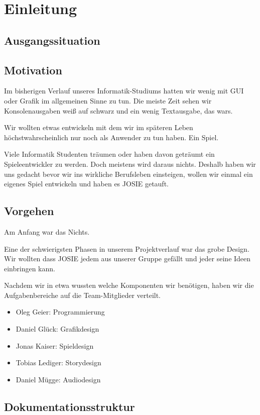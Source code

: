 \chapter{Einleitung}\label{ch:intro}

\section{Ausgangssituation}

\section{Motivation}

Im bisherigen Verlauf unseres Informatik-Studiums hatten wir wenig mit GUI oder Grafik im allgemeinen Sinne zu tun. Die meiste Zeit sehen wir Konsolenausgaben weiß auf schwarz und ein wenig Textausgabe, das wars. 

Wir wollten etwas entwickeln mit dem wir im späteren Leben höchstwahrscheinlich nur noch als Anwender zu tun haben. Ein Spiel. 

Viele Informatik Studenten träumen oder haben davon geträumt ein Spieleentwickler zu werden. Doch meistens wird daraus nichts. Deshalb haben wir uns gedacht bevor wir ins wirkliche Berufsleben einsteigen, wollen wir einmal ein eigenes Spiel entwickeln und haben es JOSIE getauft.

\section{Vorgehen}

Am Anfang war das Nichts.

Eine der schwierigsten Phasen in unserem Projektverlauf war das grobe Design. Wir wollten dass JOSIE jedem aus unserer Gruppe gefällt und jeder seine Ideen einbringen kann.

Nachdem wir in etwa wussten welche Komponenten wir benötigen, haben wir die Aufgabenbereiche auf die Team-Mitglieder verteilt.

\begin{itemize}

\item Oleg Geier: Programmierung

\item Daniel Glück: Grafikdesign

\item Jonas Kaiser: Spieldesign

\item Tobias Lediger: Storydesign

\item Daniel Mügge: Audiodesign

\end{itemize}




\section{Dokumentationsstruktur}



